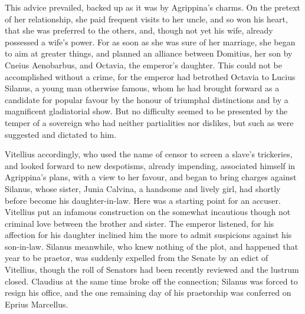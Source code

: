 This advice prevailed, backed up as it was by Agrippina's charms. On the pretext of her relationship, she paid frequent visits to her uncle, and so won his heart, that she was preferred to the others, and, though not yet his wife, already possessed a wife's power. For as soon as she was sure of her marriage, she began to aim at greater things, and planned an alliance between Domitius, her son by Cneius Aenobarbus, and Octavia, the emperor's daughter. This could not be accomplished without a crime, for the emperor had betrothed Octavia to Lucius Silanus, a young man otherwise famous, whom he had brought forward as a candidate for popular favour by the honour of triumphal distinctions and by a magnificent gladiatorial show. But no difficulty seemed to be presented by the temper of a sovereign who had neither partialities nor dislikes, but such as were suggested and dictated to him.


Vitellius accordingly, who used the name of censor to screen a slave's trickeries, and looked forward to new despotisms, already impending, associated himself in Agrippina's plans, with a view to her favour, and began to bring charges against Silanus, whose sister, Junia Calvina, a handsome and lively girl, had shortly before become his daughter-in-law. Here was a starting point for an accuser. Vitellius put an infamous construction on the somewhat incautious though not criminal love between the brother and sister. The emperor listened, for his affection for his daughter inclined him the more to admit suspicions against his son-in-law. Silanus meanwhile, who knew nothing of the plot, and happened that year to be praetor, was suddenly expelled from the Senate by an edict of Vitellius, though the roll of Senators had been recently reviewed and the lustrum closed. Claudius at the same time broke off the connection; Silanus was forced to resign his office, and the one remaining day of his praetorship was conferred on Eprius Marcellus.


